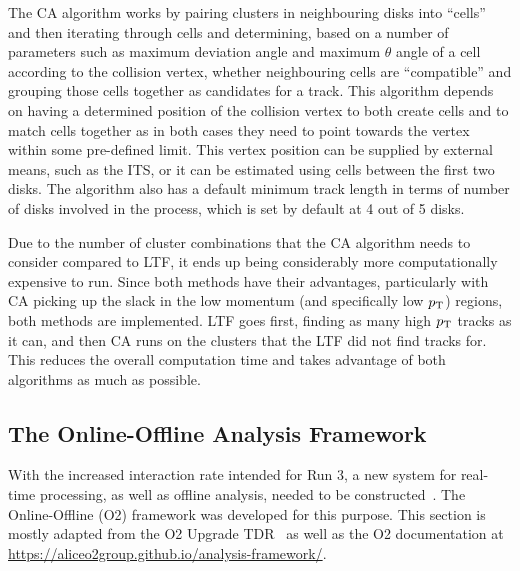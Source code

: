 The CA algorithm works by pairing clusters in neighbouring disks into ``cells'' and then iterating through cells and determining, based on a number of parameters such as maximum deviation angle and maximum $\theta$ angle of a cell according to the collision vertex, whether neighbouring cells are ``compatible'' and grouping those cells together as candidates for a track. This algorithm depends on having a determined position of the collision vertex to both create cells and to match cells together as in both cases they need to point towards the vertex within some pre-defined limit. This vertex position can be supplied by external means, such as the ITS, or it can be estimated using cells between the first two disks. The algorithm also has a default minimum track length in terms of number of disks involved in the process, which is set by default at 4 out of 5 disks. 

Due to the number of cluster combinations that the CA algorithm needs to consider compared to LTF, it ends up being considerably more computationally expensive to run. Since both methods have their advantages, particularly with CA picking up the slack in the low momentum (and specifically low $p_\mathrm{T}$) regions, both methods are implemented. LTF goes first, finding as many high $p_\mathrm{T}$ tracks as it can, and then CA runs on the clusters that the LTF did not find tracks for. This reduces the overall computation time and takes advantage of both algorithms as much as possible. 


\subsection{The Online-Offline Analysis Framework}
With the increased interaction rate intended for Run 3, a new system for real-time processing, as well as offline analysis, needed to be constructed~\cite{ALICE_Upgrade_LOI}. The Online-Offline (O2) framework was developed for this purpose. This section is mostly adapted from the O2 Upgrade TDR~\cite{O2_Upgrade_TDR} as well as the O2 documentation at \url{https://aliceo2group.github.io/analysis-framework/}.

